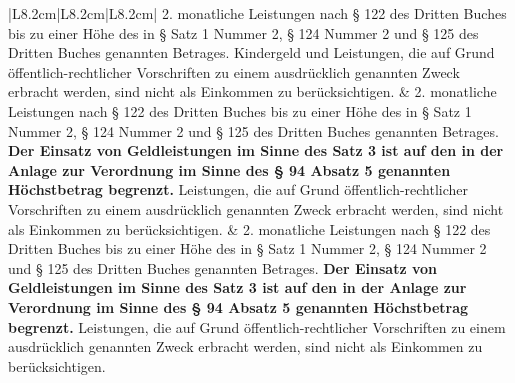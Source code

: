 \documentclass[10pt,a4paper,landscape]{article}
\begin{document}
\begin{longtable}{|L{8.2cm}|L{8.2cm}|L{8.2cm}|}
2.   \newline monatliche Leistungen nach \S{} 122 des  \newline Dritten Buches bis zu einer Höhe des in \S{}   Satz 1 Nummer 2, \S{} 124 Nummer 2  \newline und \S{} 125 des Dritten Buches genannten  \newline Betrages. \textcolor{diffred}{Kindergeld und} Leistungen, die  \newline auf Grund öffentlich-rechtlicher Vorschriften  \newline zu einem ausdrücklich genannten Zweck  \newline erbracht werden, sind nicht als Einkommen  \newline zu berücksichtigen. & 2.   \newline monatliche Leistungen nach \S{} 122 des  \newline Dritten Buches bis zu einer Höhe des in \S{}   Satz 1 Nummer 2, \S{} 124 Nummer 2  \newline und \S{} 125 des Dritten Buches genannten  \newline Betrages. \textbf{Der Einsatz von  \newline Geldleistungen im Sinne des Satz 3 ist  \newline auf den in der Anlage zur Verordnung im  \newline Sinne des \S{} 94 Absatz 5 genannten  \newline Höchstbetrag begrenzt.} Leistungen, die  \newline auf Grund öffentlich-rechtlicher Vorschriften  \newline zu einem ausdrücklich genannten Zweck  \newline erbracht werden, sind nicht als Einkommen  \newline zu berücksichtigen. & 2.   monatliche Leistungen nach \S{} 122 des  \newline Dritten Buches bis zu einer Höhe des in \S{}   Satz 1 Nummer 2, \S{} 124 Nummer 2  \newline und \S{} 125 des Dritten Buches genannten  \newline Betrages. \textbf{Der Einsatz von  \newline Geldleistungen im Sinne des Satz 3 ist  \newline auf den in der Anlage zur Verordnung im  \newline Sinne des \S{} 94 Absatz 5 genannten  \newline Höchstbetrag begrenzt.} Leistungen, die  \newline auf Grund öffentlich-rechtlicher Vorschriften  \newline zu einem ausdrücklich genannten Zweck  \newline erbracht werden, sind nicht als Einkommen  \newline zu berücksichtigen. \\

\end{longtable}
\end{document}
